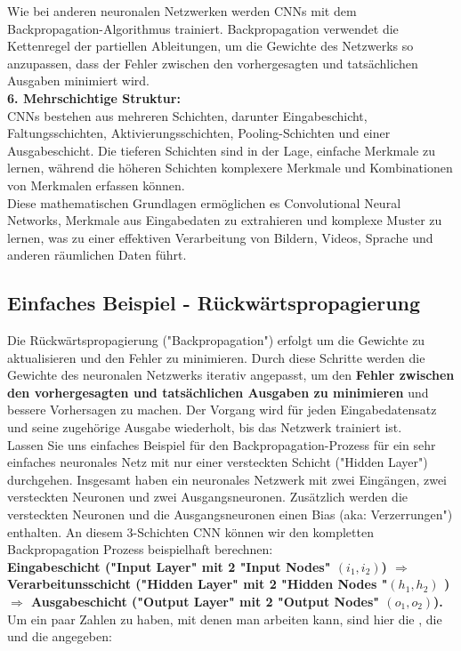 \documentclass[12pt]{article}
\begin{document}
Wie bei anderen neuronalen Netzwerken werden CNNs mit dem Backpropagation-Algorithmus trainiert. Backpropagation verwendet die Kettenregel der partiellen Ableitungen, um die Gewichte des Netzwerks so anzupassen, dass der Fehler zwischen den vorhergesagten und tatsächlichen Ausgaben minimiert wird.\\
\textbf{6. Mehrschichtige Struktur:}\\
CNNs bestehen aus mehreren Schichten, darunter Eingabeschicht, Faltungsschichten, Aktivierungsschichten, Pooling-Schichten und einer Ausgabeschicht. Die tieferen Schichten sind in der Lage, einfache Merkmale zu lernen, während die höheren Schichten komplexere Merkmale und Kombinationen von Merkmalen erfassen können.
\\
Diese mathematischen Grundlagen ermöglichen es Convolutional Neural Networks, Merkmale aus Eingabedaten zu extrahieren und komplexe Muster zu lernen, was zu einer effektiven Verarbeitung von Bildern, Videos, Sprache und anderen räumlichen Daten führt.

\subsection{Einfaches Beispiel - Rückwärtspropagierung}

Die Rückwärtspropagierung ("Backpropagation") erfolgt um die Gewichte zu aktualisieren und den Fehler zu minimieren. Durch diese Schritte werden die Gewichte des neuronalen Netzwerks iterativ angepasst, um den \textbf{Fehler zwischen den vorhergesagten und tatsächlichen Ausgaben zu minimieren} und bessere Vorhersagen zu machen. Der Vorgang wird für jeden Eingabedatensatz und seine zugehörige Ausgabe wiederholt, bis das Netzwerk trainiert ist.
\\Lassen Sie uns einfaches Beispiel für den Backpropagation-Prozess für ein sehr einfaches neuronales Netz mit nur einer versteckten Schicht ("Hidden Layer") durchgehen. Insgesamt haben ein neuronales Netzwerk mit zwei Eingängen, zwei versteckten Neuronen und zwei Ausgangsneuronen. Zusätzlich werden die versteckten Neuronen und die Ausgangsneuronen einen Bias (aka: Verzerrungen") enthalten. An diesem 3-Schichten CNN können wir den kompletten Backpropagation Prozess beispielhaft berechnen:\\
\textbf{Eingabeschicht ("Input Layer" mit 2 "Input Nodes" $(i_1,i_2)$) $\Rightarrow$ Verarbeitunsschicht ("Hidden Layer" mit 2 "Hidden Nodes "$(h_1,h_2)$ ) $\Rightarrow$ Ausgabeschicht ("Output Layer" mit 2 "Output Nodes" $(o_1,o_2)$).} \\ 
Um ein paar Zahlen zu haben, mit denen man arbeiten kann, sind hier die {\color{red}{anfänglichen Gewichte}}, die {\color{orange}{Bias("Verzerrungen")}} und die {\color{blue}{Trainingsinputs/-outputs}} angegeben:\\
\end{document}
